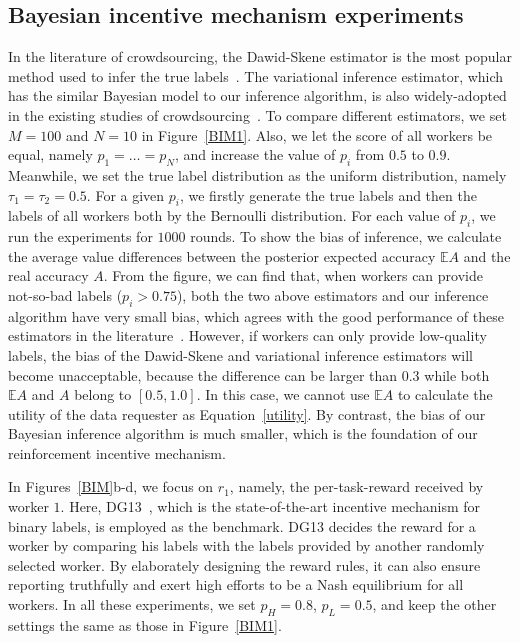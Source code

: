 \documentclass{article}
\begin{document}
\subsection{Bayesian incentive mechanism experiments}
In the literature of crowdsourcing, the Dawid-Skene estimator is the most popular method used to infer the true labels~\cite{dawid1979maximum,raykar2010learning}.
The variational inference estimator, which has the similar Bayesian model to our inference algorithm, is also widely-adopted in the existing studies of crowdsourcing~\cite{liu2012variational,chen2015statistical}.
To compare different estimators, we set $M=100$ and $N=10$ in Figure~\ref{BIM1}. Also, we let the score of all workers be equal, namely $p_1= \ldots=p_N$, and increase the value of $p_i$ from $0.5$ to $0.9$. Meanwhile, we set the true label distribution as the uniform distribution, namely $\tau_1=\tau_2=0.5$. For a given $p_i$, we firstly generate the true labels and then the labels of all workers both by the Bernoulli distribution. For each value of $p_i$, we run the experiments for $1000$ rounds. To show the bias of inference, we calculate the average value differences between the posterior expected accuracy $\mathbb{E}A$ and the real accuracy $A$. From the figure, we can find that, when workers can provide not-so-bad labels ($p_i>0.75$), both the two above estimators and our inference algorithm have very small bias, which agrees with the good performance of these estimators in the literature~\cite{raykar2010learning,liu2012variational}. However, if workers can only provide low-quality labels, the bias of the Dawid-Skene and variational inference estimators will become unacceptable, because the difference can be larger than $0.3$ while both $\mathbb{E}A$ and $A$ belong to $[0.5,1.0]$. In this case, we cannot use $\mathbb{E}A$ to calculate the utility of the data requester as Equation~\ref{utility}. By contrast, the bias of our Bayesian inference algorithm is much smaller, which is the foundation of our reinforcement incentive mechanism.


In Figures~\ref{BIM}b-d, we focus on $r_1$, namely, the per-task-reward received by worker $1$. Here, DG13~\cite{dasgupta2013crowdsourced,liu2017sequential}, which is the state-of-the-art incentive mechanism for binary labels, is employed as the benchmark.
DG13 decides the reward for a worker by comparing his labels with the labels provided by another randomly selected worker.
By elaborately designing the reward rules, it can also ensure reporting truthfully and exert high efforts to be a Nash equilibrium for all workers.
In all these experiments, we set $p_H=0.8$, $p_L=0.5$, and keep the other settings the same as those in Figure~\ref{BIM1}.
\end{document}
